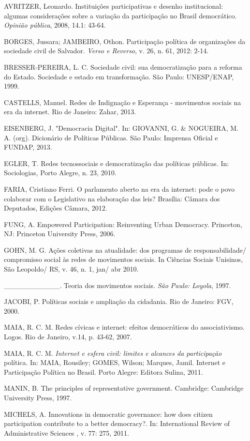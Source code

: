AVRITZER, Leonardo. Instituições participativas e desenho institucional:
algumas considerações sobre a variação da participação no Brasil
democrático. \emph{Opinião pública}, 2008, 14.1: 43-64.

BORGES, Jussara; JAMBEIRO, Othon. Participação política de organizações
da sociedade civil de Salvador. \emph{Verso e Reverso}, v. 26, n. 61,
2012: 2-14.

BRESSER-PEREIRA, L. C. Sociedade civil: sua democratização para a
reforma do Estado. Sociedade e estado em transformação. São Paulo:
UNESP/ENAP, 1999.

CASTELLS, Manuel. Redes de Indignação e Esperança - movimentos sociais
na era da internet. Rio de Janeiro: Zahar, 2013.

EISENBERG, J. "Democracia Digital". In: GIOVANNI, G. \& NOGUEIRA, M. A.
(org). Dicionário de Políticas Públicas. São Paulo: Imprensa Oficial e
FUNDAP, 2013.

EGLER, T. Redes tecnossociais e democratização das políticas públicas.
In: Sociologias, Porto Alegre, n. 23, 2010.

FARIA, Cristiano Ferri. O parlamento aberto na era da internet: pode o
povo colaborar com o Legislativo na elaboração das leis? Brasília:
Câmara dos Deputados, Edições Câmara, 2012.

FUNG, A. Empowered Participation: Reinventing Urban Democracy.
Princeton, NJ: Princeton University Press, 2006.

GOHN, M. G. Ações coletivas na atualidade: dos programas de
responsabilidade/ compromisso social às redes de movimentos sociais. In
Ciências Sociais Unisinos, São Leopoldo/ RS, v. 46, n. 1, jan/ abr 2010.

\_\_\_\_\_\_\_\_\_\_\_. Teoria dos movimentos sociais. \emph{São Paulo:
Loyola}, 1997.

JACOBI, P. Políticas sociais e ampliação da cidadania. Rio de Janeiro:
FGV, 2000.

MAIA, R. C. M. Redes cívicas e internet: efeitos democráticos do
associativismo. Logos. Rio de Janeiro, v.14, p. 43-62, 2007.

MAIA, R. C. M. \emph{Internet e esfera civil: limites e alcances da
participação} política. In: MAIA, Rousiley; GOMES, Wilson; Marques,
Jamil. Internet e Participação Política no Brasil. Porto Alegre: Editora
Sulina, 2011.

MANIN, B. The principles of representative government. Cambridge:
Cambridge University Press, 1997.

MICHELS, A. Innovations in democratic governance: how does citizen
participation contribute to a better democracy?. In: International
Review of Administrative Sciences , v. 77: 275, 2011.

